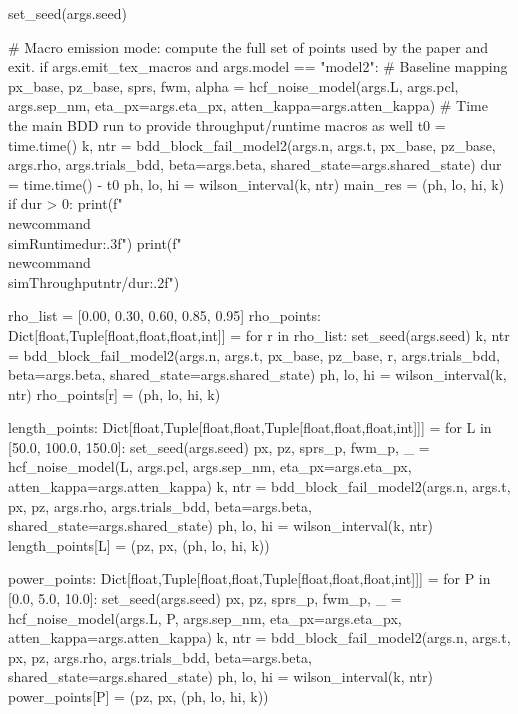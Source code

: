 {{{{    set_seed(args.seed)

    # Macro emission mode: compute the full set of points used by the paper and exit.
    if args.emit_tex_macros and args.model == "model2":
        # Baseline mapping
        px_base, pz_base, sprs, fwm, alpha = hcf_noise_model(args.L, args.pcl, args.sep_nm,
                                                             eta_px=args.eta_px, atten_kappa=args.atten_kappa)
        # Time the main BDD run to provide throughput/runtime macros as well
        t0 = time.time()
        k, ntr = bdd_block_fail_model2(args.n, args.t, px_base, pz_base, args.rho, args.trials_bdd,
                                       beta=args.beta, shared_state=args.shared_state)
        dur = time.time() - t0
        ph, lo, hi = wilson_interval(k, ntr)
        main_res = (ph, lo, hi, k)
        if dur > 0:
            print(f"\\newcommand{{\\simRuntime}}{{{dur:.3f}}}")
            print(f"\\newcommand{{\\simThroughput}}{{{ntr/dur:.2f}}}")

        rho_list = [0.00, 0.30, 0.60, 0.85, 0.95]
        rho_points: Dict[float,Tuple[float,float,float,int]] = {}
        for r in rho_list:
            set_seed(args.seed)
            k, ntr = bdd_block_fail_model2(args.n, args.t, px_base, pz_base, r, args.trials_bdd,
                                           beta=args.beta, shared_state=args.shared_state)
            ph, lo, hi = wilson_interval(k, ntr)
            rho_points[r] = (ph, lo, hi, k)

        length_points: Dict[float,Tuple[float,float,Tuple[float,float,float,int]]] = {}
        for L in [50.0, 100.0, 150.0]:
            set_seed(args.seed)
            px, pz, sprs_p, fwm_p, _ = hcf_noise_model(L, args.pcl, args.sep_nm,
                                                       eta_px=args.eta_px, atten_kappa=args.atten_kappa)
            k, ntr = bdd_block_fail_model2(args.n, args.t, px, pz, args.rho, args.trials_bdd,
                                           beta=args.beta, shared_state=args.shared_state)
            ph, lo, hi = wilson_interval(k, ntr)
            length_points[L] = (pz, px, (ph, lo, hi, k))

        power_points: Dict[float,Tuple[float,float,Tuple[float,float,float,int]]] = {}
        for P in [0.0, 5.0, 10.0]:
            set_seed(args.seed)
            px, pz, sprs_p, fwm_p, _ = hcf_noise_model(args.L, P, args.sep_nm,
                                                       eta_px=args.eta_px, atten_kappa=args.atten_kappa)
            k, ntr = bdd_block_fail_model2(args.n, args.t, px, pz, args.rho, args.trials_bdd,
                                           beta=args.beta, shared_state=args.shared_state)
            ph, lo, hi = wilson_interval(k, ntr)
            power_points[P] = (pz, px, (ph, lo, hi, k))

}}}}
